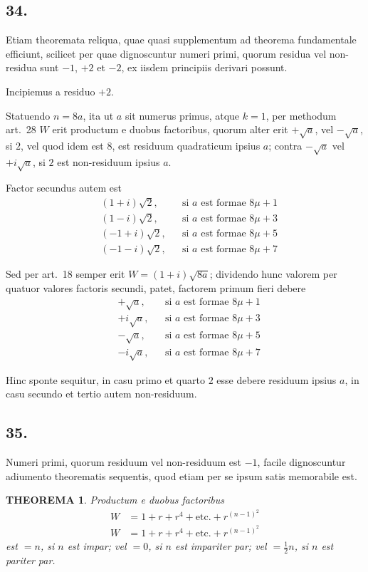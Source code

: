 \documentclass[12pt,a4paper]{article}
\theoremstyle{plain}
\newtheorem*{theorem}{THEOREMA}
\theoremstyle{definition}
\theoremstyle{remark}
\begin{document}
\subsection*{34.}
Etiam theoremata reliqua, quae quasi supplementum ad theorema fundamentale efficiunt, scilicet per quae dignoscuntur numeri primi, quorum residua vel non-residua sunt $-1$, $+2$ et $-2$, ex iisdem principiis derivari possunt.

Incipiemus a residuo $+2$.

Statuendo $n=8a$, ita ut $a$ sit numerus primus, atque $k=1$, per methodum art.~28 $W$ erit productum e duobus factoribus, quorum alter erit $+\sqrt{a}$, vel $-\sqrt{a}$, si $2$, vel quod idem est $8$, est residuum quadraticum ipsius $a$; contra $-\sqrt{a}$ vel $+i\sqrt{a}$, si $2$ est non-residuum ipsius $a$.

Factor secundus autem est
\begin{align*}
&(1+i)\sqrt{2}, &&\text{si }a\text{ est formae }8\mu+1\\
&(1-i)\sqrt{2}, &&\text{si }a\text{ est formae }8\mu+3\\
&(-1+i)\sqrt{2}, &&\text{si }a\text{ est formae }8\mu+5\\
&(-1-i)\sqrt{2}, &&\text{si }a\text{ est formae }8\mu+7
\end{align*}

Sed per art.~18 semper erit $W=(1+i)\sqrt{8a}$; dividendo hunc valorem per quatuor valores factoris secundi, patet, factorem primum fieri debere
\begin{align*}
&+\sqrt{a}, &&\text{si }a\text{ est formae }8\mu+1\\
&+i\sqrt{a}, &&\text{si }a\text{ est formae }8\mu+3\\
&-\sqrt{a}, &&\text{si }a\text{ est formae }8\mu+5\\
&-i\sqrt{a}, &&\text{si }a\text{ est formae }8\mu+7
\end{align*}

Hinc sponte sequitur, in casu primo et quarto $2$ esse debere residuum ipsius $a$, in casu secundo et tertio autem non-residuum.

\newpage
\subsection*{35.}
Numeri primi, quorum residuum vel non-residuum est $-1$, facile dignoscuntur adiumento theorematis sequentis, quod etiam per se ipsum satis memorabile est.

\begin{theorem}
Productum e duobus factoribus
\begin{align*}
W &= 1 + r + r^4 + \text{etc.} + r^{(n-1)^2}\\
W &= 1 + r + r^4 + \text{etc.} + r^{(n-1)^2}
\end{align*}
est $=n$, si $n$ est impar; vel $=0$, si $n$ est impariter par; vel $=\frac{1}{2}n$, si $n$ est pariter par.
\end{theorem}
\end{document}
